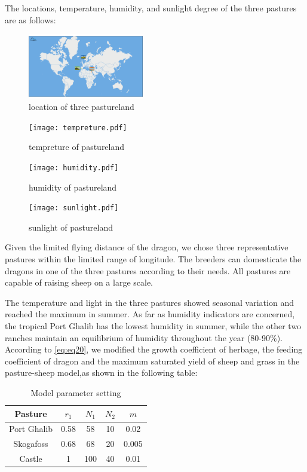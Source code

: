 \documentclass[12pt]{article}  %
\begin{document}
The locations, temperature, humidity, and sunlight degree of the three pastures are as follows:
\begin{figure}[htbp]
	\centering
	\includegraphics[width=0.45\textwidth]{location.pdf}
	\caption{location of three pastureland}\label{fig:work1}
 \end{figure}
 \newpage
 \begin{figure}[htbp]
	\centering
	\begin{minipage}[t]{0.3\textwidth}
		\centering
		\texttt{[image: tempreture.pdf]}
		\caption{tempreture of pastureland}\label{fig:quanju}
	\end{minipage}
	\begin{minipage}[t]{0.3\textwidth}
		\centering
		\texttt{[image: humidity.pdf]}
		\caption{humidity of pastureland}\label{fig:jubu}
	\end{minipage}
 	\begin{minipage}[t]{0.3\textwidth}
		\centering
		\texttt{[image: sunlight.pdf]}
		\caption{sunlight of pastureland}\label{fig:jubu}
	\end{minipage}
\end{figure}

Given the limited flying distance of the dragon, we chose three representative pastures within the limited range of longitude. The breeders can domesticate the dragons in one of the three pastures according to their needs. All pastures are capable of raising sheep on a large scale.


The temperature and light in the three pastures showed seasonal variation and reached the maximum in summer. As far as humidity indicators are concerned, the tropical Port Ghalib has the lowest humidity in summer, while the other two ranches maintain an equilibrium of humidity throughout the year (80-90\%). According to \eqref{eq:eq20}, we modified the growth coefficient of herbage, the feeding coefficient of dragon and the maximum saturated yield of sheep and grass in the pasture-sheep model,as shown in the following table:

\begin{table}[!htbp]
	\caption{Model parameter setting}
    \label{tab:table_two}
    \centering
	\begin{tabular}{ccccc}
\toprule
Pasture	&$r_1$&$N_1$&$N_2$&$m$	\\
		\midrule[0.75pt]
  	Port Ghalib & 0.58 & 58&10&0.02\\
 	Skogafoss & 0.68 & 68&20&0.005\\
 	Castle & 1 & 100&40&0.01\\
		\bottomrule[1.5pt]
	\end{tabular}
\end{table}
\end{document}
